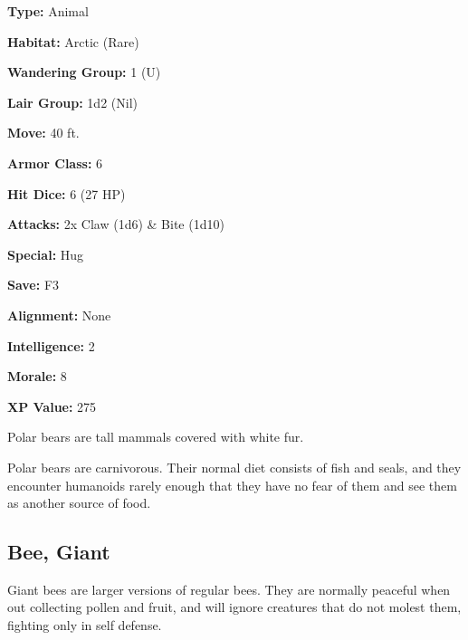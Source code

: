 \begin{multicols*}{2}
{\textbf{Type:} Animal

\textbf{Habitat:} Arctic (Rare)

\textbf{Wandering Group:} 1 (U)

\textbf{Lair Group:} 1d2 (Nil)

\textbf{Move:} 40 ft.

\textbf{Armor Class:} 6

\textbf{Hit Dice:} 6 (27 HP)

\textbf{Attacks:} 2x Claw (1d6) \& Bite (1d10)

\textbf{Special:} Hug

\textbf{Save:} F3

\textbf{Alignment:} None

\textbf{Intelligence:} 2

\textbf{Morale:} 8

\textbf{XP Value:} 275}

Polar bears are tall mammals covered with white fur.

Polar bears are carnivorous. Their normal diet consists of fish and seals, and they encounter humanoids rarely enough that they have no fear of them and see them as another source of food.

\subsection{Bee, Giant}

Giant bees are larger versions of regular bees. They are normally peaceful when out collecting pollen and fruit, and will ignore creatures that do not molest them, fighting only in self defense.


\end{multicols*}
